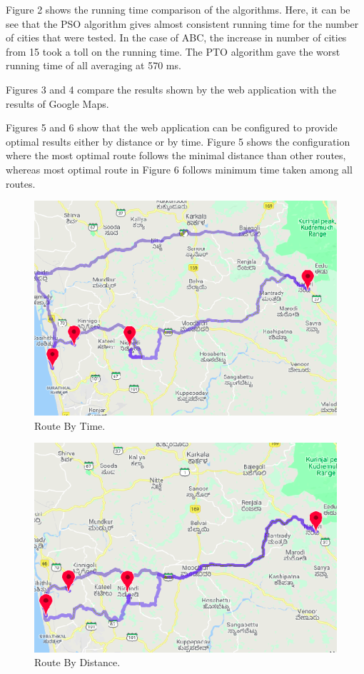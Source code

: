 \documentclass[conference]{IEEEtran}
\begin{document}
Figure 2 shows the running time comparison of the algorithms. Here, it can be see that the PSO algorithm gives almost consistent running time for the number of cities that were tested. In the case of ABC, the increase in number of cities from 15 took a toll on the running time. The PTO algorithm gave the worst running time of all averaging at 570 ms. 

Figures 3 and 4 compare the results shown by the web application with the results of Google Maps. 

Figures 5 and 6 show that the web application can be configured to provide optimal results either by distance or by time. Figure 5 shows the configuration where the most optimal route follows the minimal distance than other routes, whereas most optimal route in Figure 6 follows minimum time taken among all routes.


\begin{figure}[htbp]
\centerline{\includegraphics[width=\columnwidth]{distance.png}}
\caption{Route By Time.}
\label{fig5}
\end{figure}

\begin{figure}[htbp]
\centerline{\includegraphics[width=\columnwidth]{time.png}}
\caption{Route By Distance.}
\label{fig6}
\end{figure}
\end{document}
